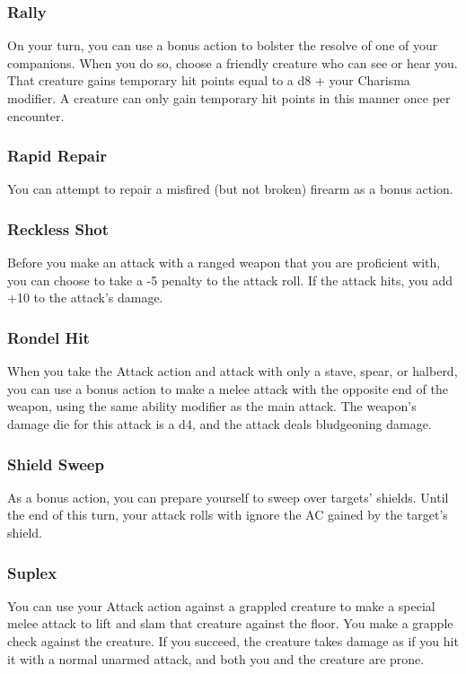 \subsubsection{Rally} \label{tec::rally}
On your turn, you can use a bonus action to bolster the resolve of one of your companions.
When you do so, choose a friendly creature who can see or hear you.
That creature gains temporary hit points equal to a d8 + your Charisma modifier.
A creature can only gain temporary hit points in this manner once per encounter.

\subsubsection{Rapid Repair} \label{tec::rapidrepair}
You can attempt to repair a misfired (but not broken) firearm as a bonus action.

\subsubsection{Reckless Shot} \label{tec::recklessshot}
Before you make an attack with a ranged weapon that you are proficient with, you can choose to take a -5 penalty to the attack roll.
If the attack hits, you add +10 to the attack's damage.

\subsubsection{Rondel Hit} \label{tec::rondelhit}
When you take the Attack action and attack with only a stave, spear, or halberd, you can use a bonus action to make a melee attack with the opposite end of the weapon, using the same ability modifier as the main attack.
The weapon's damage die for this attack is a d4, and the attack deals bludgeoning damage.

\subsubsection{Shield Sweep} \label{tec::shieldsweep}
As a bonus action, you can prepare yourself to sweep over targets' shields.
Until the end of this turn, your attack rolls with ignore the AC gained by the target's shield.

\subsubsection{Suplex} \label{tec::suplex}
You can use your Attack action against a grappled creature to make a special melee attack to lift and slam that creature against the floor.
You make a grapple check against the creature.
If you succeed, the creature takes damage as if you hit it with a normal unarmed attack, and both you and the creature are prone.

